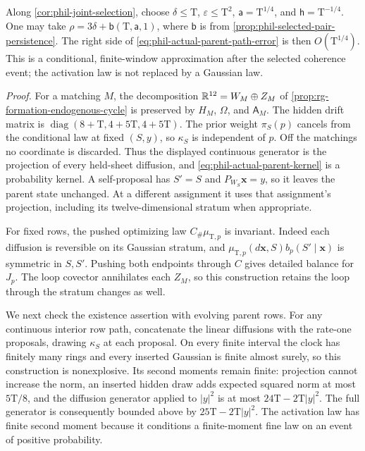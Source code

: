 Along \cref{cor:phil-joint-selection}, choose
\(\delta\le\mathrm T\), \(\varepsilon\le\mathrm T^2\),
\(\mathsf a=\mathrm T^{1/4}\), and
\(\mathsf h=\mathrm T^{-1/4}\). One may take
\(\rho=3\delta+\mathsf b(\mathrm T,\mathsf a,1)\), where
\(\mathsf b\) is from \cref{prop:phil-selected-pair-persistence}.
The right side of \cref{eq:phil-actual-parent-path-error} is then
\(O(\mathrm T^{1/4})\). This is a conditional, finite-window
approximation after the selected coherence event; the activation law
is not replaced by a Gaussian law.

\noindent\emph{Proof.}
For a matching \(M\), the decomposition
\(\mathbb R^{12}=W_M\oplus Z_M\) of
\cref{prop:rg-formation-endogenous-cycle} is preserved by
\(H_M\), \(\Omega\), and \(\mathsf A_M\).
The hidden drift matrix is
\(\operatorname{diag}(8+\mathrm T,4+5\mathrm T,4+5\mathrm T)\).
The prior weight \(\pi_S(p)\) cancels from the conditional law at
fixed \((S,y)\), so \(\kappa_S\) is independent of \(p\).
Off the matchings no coordinate is discarded. Thus the displayed
continuous generator is the projection of every held-sheet diffusion,
and \cref{eq:phil-actual-parent-kernel} is a probability kernel.
A self-proposal has \(S'=S\) and
\(P_{W_S}\mathbf x=y\), so it leaves the parent state unchanged.
At a different assignment it uses that assignment's projection,
including its twelve-dimensional stratum when appropriate.

For fixed rows, the pushed optimizing law \(C_\#\mu_{\mathrm T,p}\)
is invariant. Indeed each diffusion is reversible on its Gaussian
stratum, and
\(\mu_{\mathrm T,p}(d\mathbf x,S)b_p(S'\mid\mathbf x)\)
is symmetric in \(S,S'\). Pushing both endpoints through \(C\)
gives detailed balance for \(J_p\).
The loop covector annihilates each \(Z_M\), so this construction
retains the loop through the stratum changes as well.

We next check the existence assertion with evolving parent rows.
For any continuous interior row path, concatenate the linear
diffusions with the rate-one proposals, drawing \(\kappa_S\) at
each proposal. On every finite interval the clock has finitely many
rings and every inserted Gaussian is finite almost surely, so this
construction is nonexplosive. Its second moments remain finite:
projection cannot increase the norm, an inserted hidden draw adds
expected squared norm at most \(5\mathrm T/8\), and the diffusion
generator applied to \(|y|^2\) is at most
\(24\mathrm T-2\mathrm T|y|^2\). The full generator is consequently
bounded above by \(25\mathrm T-2\mathrm T|y|^2\).
The activation law has finite second moment because it conditions a
finite-moment fine law on an event of positive probability.

